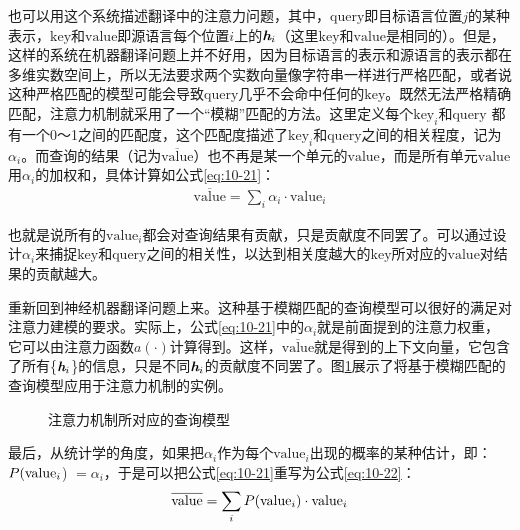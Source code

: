 \parinterval 也可以用这个系统描述翻译中的注意力问题，其中，$\mathrm{query}$即目标语言位置$j$的某种表示，$\mathrm{key}$和$\mathrm{value}$即源语言每个位置$i$上的${\textbf{\em h}_i}$（这里$\mathrm{key}$和$\mathrm{value}$是相同的）。但是，这样的系统在机器翻译问题上并不好用，因为目标语言的表示和源语言的表示都在多维实数空间上，所以无法要求两个实数向量像字符串一样进行严格匹配，或者说这种严格匹配的模型可能会导致$\mathrm{query}$几乎不会命中任何的$\mathrm{key}$。既然无法严格精确匹配，注意力机制就采用了一个“模糊”匹配的方法。这里定义每个$\mathrm{key}_i$和$\mathrm{query}$ 都有一个0～1之间的匹配度，这个匹配度描述了$\mathrm{key}_i$和$\mathrm{query}$之间的相关程度，记为$\alpha_i$。而查询的结果（记为$\overline{\mathrm{value}}$）也不再是某一个单元的$\mathrm{value}$，而是所有单元$\mathrm{value}$用$\alpha_i$的加权和，具体计算如公式\eqref{eq:10-21}：
\begin{eqnarray}
\overline{\mathrm{value}} = \sum_i \alpha_i \cdot {\mathrm{value}}_i
\label{eq:10-21}
\end{eqnarray}

\noindent 也就是说所有的$\mathrm{value}_i$都会对查询结果有贡献，只是贡献度不同罢了。可以通过设计$\alpha_i$来捕捉$\mathrm{key}$和$\mathrm{query}$之间的相关性，以达到相关度越大的$\mathrm{key}$所对应的$\mathrm{value}$对结果的贡献越大。

\parinterval 重新回到神经机器翻译问题上来。这种基于模糊匹配的查询模型可以很好的满足对注意力建模的要求。实际上，公式\eqref{eq:10-21}中的$\alpha_i$就是前面提到的注意力权重，它可以由注意力函数$a(\cdot)$计算得到。这样，$\overline{\mathrm{value}}$就是得到的上下文向量，它包含了所有\{$\textbf{\em h}_i$\}的信息，只是不同$\textbf{\em h}_i$的贡献度不同罢了。图\ref{fig:10-23}展示了将基于模糊匹配的查询模型应用于注意力机制的实例。

\begin{figure}[htp]
\centering

\caption{注意力机制所对应的查询模型}
\label{fig:10-23}
\end{figure}

\parinterval 最后，从统计学的角度，如果把$\alpha_i$作为每个$\mathrm{value}_i$出现的概率的某种估计，即：$ {P} (\mathrm{value}_i$) $= \alpha_i$，于是可以把公式\eqref{eq:10-21}重写为公式\eqref{eq:10-22}：
\begin{eqnarray}
\overline{\mathrm{value}} = \sum_i {P} ( {\mathrm{value}}_i) \cdot {\mathrm{value}}_i
\label{eq:10-22}
\end{eqnarray}

